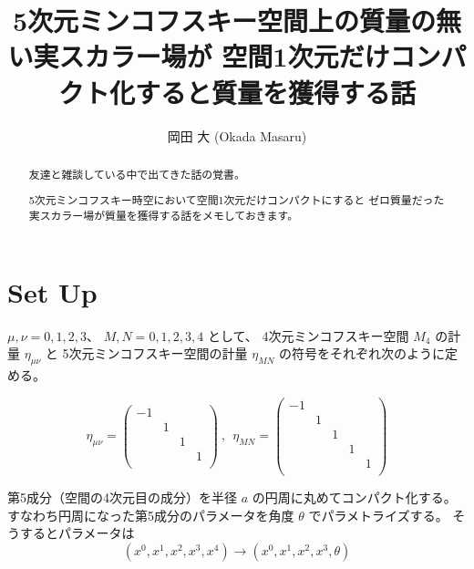 \documentclass{article}
\title{
5次元ミンコフスキー空間上の質量の無い実スカラー場が \newline 空間1次元だけコンパクト化すると質量を獲得する話
}
\author{
岡田 大 (Okada Masaru)
}
\begin{document}
\maketitle

\begin{abstract}
	友達と雑談している中で出てきた話の覚書。

	5次元ミンコフスキー時空において空間1次元だけコンパクトにすると
	ゼロ質量だった実スカラー場が質量を獲得する話をメモしておきます。
\end{abstract}

\section{Set Up}

$\mu,\nu = 0,1,2,3$、
$M,N=0,1,2,3,4$
として、
4次元ミンコフスキー空間
$M_{4}$
の計量
$\eta_{\mu \nu}$
と
5次元ミンコフスキー空間の計量
$\eta_{MN}$
の符号をそれぞれ次のように定める。

$$
	\eta_{\mu \nu}
	=
	\begin{pmatrix}
		-1 &   &   &   \\
		   & 1 &   &   \\
		   &   & 1 &   \\
		   &   &   & 1 \\
	\end{pmatrix}
	\ , \ \
	\eta_{MN}
	=
	\begin{pmatrix}
		-1 &   &   &   &   \\
		   & 1 &   &   &   \\
		   &   & 1 &   &   \\
		   &   &   & 1 &   \\
		   &   &   &   & 1 \\
	\end{pmatrix}
$$

第5成分（空間の4次元目の成分）を半径 $a$ の円周に丸めてコンパクト化する。
すなわち円周になった第5成分のパラメータを角度
$\theta$
でパラメトライズする。
そうするとパラメータは
$$
	(x^0, x^1, x^2, x^3, x^4)
	\to
	(x^0, x^1, x^2, x^3, \theta)
$$
\end{document}
